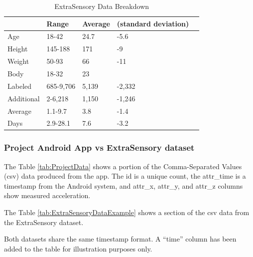 \documentclass{UoNMCHA}
\newcommand{\inlineQuote}[1]{``#1''}
\newcommand{\tref}[1] {Table \ref{#1}}
\numberwithin{equation}{section}
\begin{document}
\begin{table}[h]
    \begin{center}  
        \caption{ExtraSensory Data Breakdown \cite{Vaizman2017}}\label{tab:ExtraSensoryDataBreakdown}
        \begin{tabular}{lllll}
            \hline\hline 
                       & Range     & Average & (standard deviation) &  \\
            \hline 
            Age        & 18-42     & 24.7    & -5.6                 &  \\
            Height     & 145-188   & 171     & -9                   &  \\
            Weight     & 50-93     & 66      & -11                  &  \\
            Body       & 18-32     & 23      &                      &  \\
            Labeled    & 685-9,706 & 5,139   & -2,332               &  \\
            Additional & 2-6,218   & 1,150   & -1,246               &  \\
            Average    & 1.1-9.7   & 3.8     & -1.4                 &  \\
            Days       & 2.9-28.1  & 7.6     & -3.2 \\
            \hline  
            \end{tabular}
    \end{center}
\end{table}

\subsubsection{Project Android App vs ExtraSensory dataset}
The \tref{tab:ProjectData} shows a portion of the Comma-Separated Values (csv) data produced from the app. The id is a unique count, the attr\_time is a timestamp from the Android system, and attr\_x, attr\_y, and attr\_z columns show measured acceleration.

The \tref{tab:ExtraSensoryDataExample} shows a section of the csv data from the ExtraSensory dataset. 

Both datasets share the same timestamp format. A \inlineQuote{time} column has been added to the table for illustration purposes only.
\end{document}
